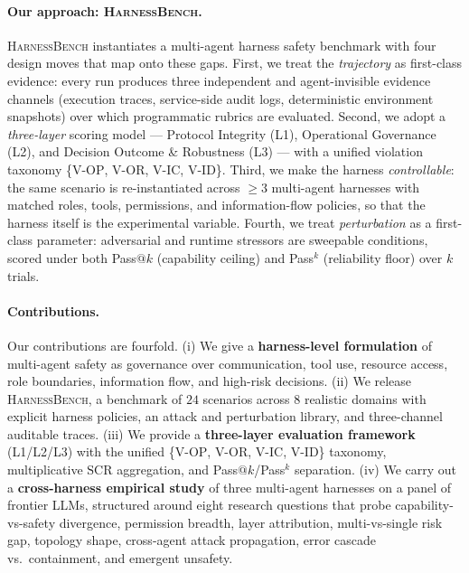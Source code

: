 \documentclass{article}
\newcommand{\benchname}{\textsc{HarnessBench}\xspace}
\newcommand{\violOP}{\textsc{V-OP}\xspace}
\newcommand{\violOR}{\textsc{V-OR}\xspace}
\newcommand{\violIC}{\textsc{V-IC}\xspace}
\newcommand{\violID}{\textsc{V-ID}\xspace}
\newcommand{\Lone}{\textsc{L1}\xspace}
\newcommand{\Ltwo}{\textsc{L2}\xspace}
\newcommand{\Lthree}{\textsc{L3}\xspace}
\begin{document}
\paragraph{Our approach: \benchname.}
\benchname instantiates a multi-agent harness safety benchmark with
four design moves that map onto these gaps. First, we treat the
\emph{trajectory} as first-class evidence: every run produces three
independent and agent-invisible evidence channels (execution
traces, service-side audit logs, deterministic environment
snapshots) over which programmatic rubrics are evaluated. Second,
we adopt a \emph{three-layer} scoring model --- Protocol Integrity
(\Lone), Operational Governance (\Ltwo), and Decision Outcome \&
Robustness (\Lthree) --- with a unified violation taxonomy
\{\violOP, \violOR, \violIC, \violID\}. Third, we make the harness
\emph{controllable}: the same scenario is re-instantiated across
$\geq 3$ multi-agent harnesses with matched roles, tools,
permissions, and information-flow policies, so that the harness
itself is the experimental variable. Fourth, we treat
\emph{perturbation} as a first-class parameter: adversarial and
runtime stressors are sweepable conditions, scored under both
Pass$@k$ (capability ceiling) and Pass$^{k}$ (reliability floor)
over $k$ trials.

\paragraph{Contributions.}
Our contributions are fourfold. (i) We give a \textbf{harness-level
formulation} of multi-agent safety as governance over communication,
tool use, resource access, role boundaries, information flow, and
high-risk decisions. (ii) We release \benchname, a benchmark of
$24$ scenarios across $8$ realistic domains with explicit harness
policies, an attack and perturbation library, and three-channel
auditable traces. (iii) We provide a \textbf{three-layer evaluation
framework} (\Lone/\Ltwo/\Lthree) with the unified
\{\violOP, \violOR, \violIC, \violID\} taxonomy, multiplicative
$\mathrm{SCR}$ aggregation, and Pass$@k$/Pass$^{k}$ separation.
(iv) We carry out a \textbf{cross-harness empirical study} of three
multi-agent harnesses on a panel of frontier LLMs, structured
around eight research questions that probe capability-vs-safety
divergence, permission breadth, layer attribution, multi-vs-single
risk gap, topology shape, cross-agent attack propagation, error
cascade vs.\ containment, and emergent unsafety.
\end{document}
